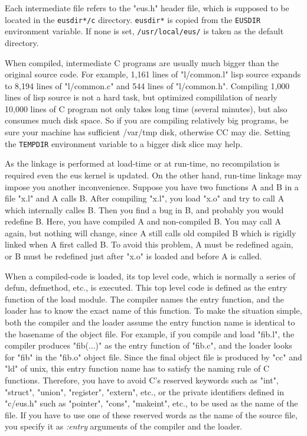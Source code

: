 Each intermediate file refers to the "eus.h" header file, which is
supposed to be located in the {\tt *eusdir*/c} directory.
{\tt *eusdir*} is copied from the {\tt EUSDIR} environment variable.
If none is set, {\tt /usr/local/eus/} is taken as the default directory.

When compiled, intermediate C programs are usually much bigger than
the original source code. For example, 1,161 lines of "l/common.l"
lisp source expands to 8,194 lines of "l/common.c" and 544 lines of "l/common.h".
Compiling 1,000 lines of lisp source is not a hard task, but 
optimized compililation of nearly 10,000 lines of C program not only takes
long time (several minutes), but also consumes much disk space.
So if you are compiling relatively big programs, be sure your machine has
sufficient /var/tmp disk, otherwise CC may die.
Setting the {\tt TEMPDIR} environment variable to a bigger disk slice may help.

As the linkage is performed at load-time or at run-time,
no recompilation  is required even the eus kernel is updated.
On the other hand, run-time linkage may impose you another inconvenience.
Suppose you have two functions A and B in a file "x.l" and A calls B.
After compiling "x.l", you load "x.o" and try to call A which internally
calles B.
Then you find a bug in B, and probably you would redefine B.
Here, you have compiled A and non-compiled B.
You may call A again, but nothing will change, since A still calls
old compiled B which is rigidly linked when A first called B.
To avoid this problem, A must be redefined again,
or B must be redefined just after "x.o" is loaded and before A is called.

When a compiled-code is loaded, its top level code, which is normally
a series of defun, defmethod, etc., is executed. This top level code
is defined as the entry function of the load module.
The compiler names the entry function,
and the loader has to know the exact name of this function.
To make the situation simple, both the compiler and the loader assume
the entry function name is identical to the basename of the object file.
For example, if you compile and load "fib.l",
the compiler produces "fib(...)" as the entry function of "fib.c",
and the loader looks for "fib" in the "fib.o" object file.
Since the final object file is produced by "cc" and "ld" of unix, 
this entry function name has to satisfy the naming rule of C functions.
Therefore, you have to avoid C's reserved keywords
such as "int", "struct", "union", "register", "extern", etc., or
the private identifiers defined in "c/eus.h" such as "pointer", "cons",
"makeint", etc., to be used as the name of the file.
If you have to use one of these reserved words as the name of the
source file, you specify it as {\em :entry} arguments of
the compiler and the loader.


